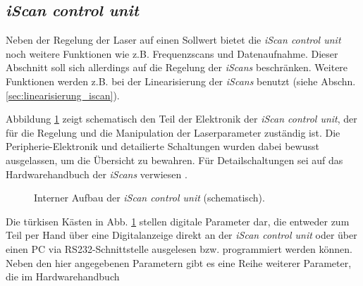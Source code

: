 \subsection{\textit{iScan control unit}}\label{subsec:iscan_control_unit}
Neben der Regelung der Laser auf einen Sollwert bietet die \textit{iScan control
unit} noch weitere Funktionen wie z.B. Frequenzscans und Datenaufnahme. Dieser
Abschnitt soll sich allerdings auf die Regelung der \textit{iScans} beschränken.
Weitere Funktionen werden z.B. bei der Linearisierung der \textit{iScans}
benutzt (siehe Abschn.
\ref{sec:linearisierung_iscan}).\par
Abbildung \ref{fig:iscan_control_unit_regelelektronik} zeigt schematisch den
Teil der Elektronik der \textit{iScan control unit}, der für die Regelung und
die Manipulation der Laserparameter zuständig ist. Die Peripherie-Elektronik und
detailierte Schaltungen wurden dabei bewusst ausgelassen, um die Übersicht zu
bewahren. Für Detailschaltungen sei auf das Hardwarehandbuch der \textit{iScans}
verwiesen \cite{iscan_hardware_guide}.\par
\begin{figure}[h]
 	\centering
	\caption[Interner Aufbau der \textit{iScan control unit}, schematisch]{Interner
	Aufbau der \textit{iScan control unit}
	(schematisch).}\label{fig:iscan_control_unit_regelelektronik}
\end{figure}
Die türkisen Kästen in Abb. \ref{fig:iscan_control_unit_regelelektronik} stellen
digitale Parameter dar, die entweder zum Teil per Hand über eine Digitalanzeige
direkt an der \textit{iScan control unit} oder über einen PC via
RS232-Schnittstelle ausgelesen bzw. programmiert werden können. Neben den hier angegebenen
Parametern gibt es eine Reihe weiterer Parameter, die im Hardwarehandbuch
